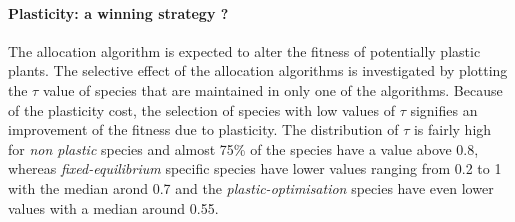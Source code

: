 %
%



\paragraph{Plasticity: a winning strategy ?}

The allocation algorithm is expected to alter the fitness of potentially plastic plants. The selective effect of the allocation algorithms is investigated by plotting the $\tau$ value of species that are maintained in only one of the algorithms. Because of the plasticity cost, the selection of species with low values of $\tau$ signifies an improvement of the fitness due to plasticity. The distribution of $\tau$ is fairly high for \textit{non plastic} species and almost 75\% of the species have a value above 0.8, whereas \textit{fixed-equilibrium} specific species have lower values ranging from 0.2 to 1 with the median arond 0.7 and the \textit{plastic-optimisation} species have even lower values with a median around 0.55.


